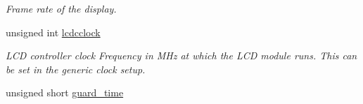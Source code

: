 \begin{CompactItemize}
\begin{CompactList}\small\item\em Frame rate of the display. \item\end{CompactList}\item 
\hypertarget{structlcdc__configuration__s_b805eb3d36039ee5609b3fc3fa22a169}{
unsigned int \hyperlink{structlcdc__configuration__s_b805eb3d36039ee5609b3fc3fa22a169}{lcdcclock}}
\label{structlcdc__configuration__s_b805eb3d36039ee5609b3fc3fa22a169}

\begin{CompactList}\small\item\em LCD controller clock Frequency in MHz at which the LCD module runs. This can be set in the generic clock setup. \item\end{CompactList}\item 
\hypertarget{structlcdc__configuration__s_06a6e0f9bf91c61ef6d4565f0a01680f}{
unsigned short \hyperlink{structlcdc__configuration__s_06a6e0f9bf91c61ef6d4565f0a01680f}{guard\_\-time}}
\label{structlcdc__configuration__s_06a6e0f9bf91c61ef6d4565f0a01680f}


\end{CompactItemize}
